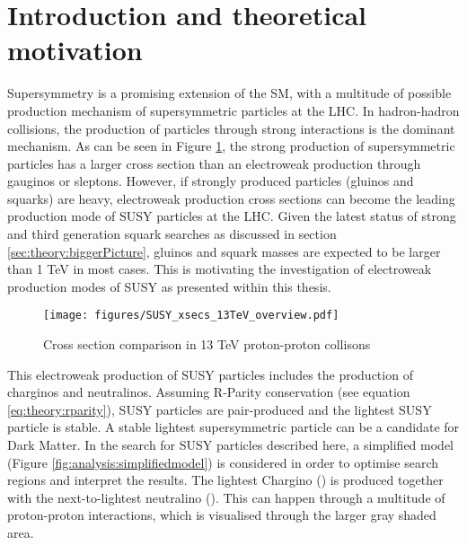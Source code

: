 \section{Introduction and theoretical motivation}
\label{sec:analysis:intro}
Supersymmetry is a promising extension of the \ac{SM},  with a multitude of possible production mechanism of supersymmetric particles at the \ac{LHC}.  In hadron-hadron collisions,  the production of particles through strong interactions is the dominant mechanism.  As can be seen in Figure \ref{fig:analysis:xsec}, the strong production of supersymmetric particles has a larger cross section than an electroweak production through gauginos or sleptons.  However, if strongly produced particles (gluinos and squarks) are heavy,  electroweak production cross sections can become the leading production mode of \ac{SUSY} particles at the \ac{LHC}.  Given the latest status of strong and third generation squark searches as discussed in section \ref{sec:theory:biggerPicture},  gluinos and squark masses are expected to be larger than 1 TeV in most cases. This is motivating the investigation of electroweak production modes of \ac{SUSY} as presented within this thesis. 


\begin{figure}
\centering
\texttt{[image: figures/SUSY\_xsecs\_13TeV\_overview.pdf]}
\caption{Cross section comparison in 13 TeV proton-proton collisons \cite{SUSYXSecWorkingGroup,XSecCalcPaper} \label{fig:analysis:xsec}}
\end{figure}
%
This electroweak production of \ac{SUSY} particles includes the production of charginos and neutralinos.  Assuming R-Parity conservation (see equation \eqref{eq:theory:rparity}),  \ac{SUSY} particles are pair-produced and the lightest \ac{SUSY} particle is stable.  A stable lightest supersymmetric particle can be a candidate for Dark Matter. 
In the search for \ac{SUSY} particles described here,  a simplified model (Figure \ref{fig:analysis:simplifiedmodel}) is considered in order to optimise search regions and interpret the results. 
The lightest Chargino (\Cone) is produced together with the next-to-lightest neutralino (\Ntwo).  This can happen through a multitude of proton-proton interactions,  which is visualised through the larger gray shaded area. 

